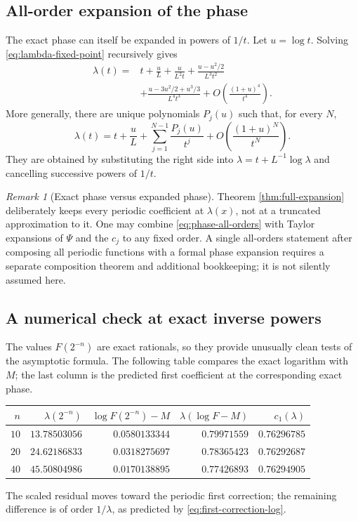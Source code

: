 \documentclass[11pt]{article}
\numberwithin{equation}{section}
\theoremstyle{definition}
\theoremstyle{remark}
\newtheorem{remark}[theorem]{Remark}
\begin{document}
\subsection{All-order expansion of the phase}

The exact phase can itself be expanded in powers of $1/t$.  Let $u=\log t$.
Solving \eqref{eq:lambda-fixed-point} recursively gives
\begin{equation}\label{eq:phase-first-terms}
 \begin{split}
 \lambda(t)={}&t+\frac{u}{L}
 +\frac{u}{L^2t}
 +\frac{u-u^2/2}{L^3t^2}\\
 &+\frac{u-3u^2/2+u^3/3}{L^4t^3}
 +O\left(\frac{(1+u)^4}{t^4}\right).
 \end{split}
\end{equation}
More generally, there are unique polynomials $P_j(u)$ such that, for every
$N$,
\begin{equation}\label{eq:phase-all-orders}
 \lambda(t)=t+\frac{u}{L}+
 \sum_{j=1}^{N-1}\frac{P_j(u)}{t^j}
 +O\left(\frac{(1+u)^N}{t^N}\right).
\end{equation}
They are obtained by substituting the right side into
$\lambda=t+L^{-1}\log\lambda$ and cancelling successive powers of $1/t$.

\begin{remark}[Exact phase versus expanded phase]
Theorem \ref{thm:full-expansion} deliberately keeps every periodic
coefficient at $\lambda(x)$, not at a truncated approximation to it.  One may
combine \eqref{eq:phase-all-orders} with Taylor expansions of $\Psi$ and the
$c_j$ to any fixed order.  A single all-orders statement after composing all
periodic functions with a formal phase expansion requires a separate
composition theorem and additional bookkeeping; it is not silently assumed
here.
\end{remark}

\subsection{A numerical check at exact inverse powers}

The values $F(2^{-n})$ are exact rationals, so they provide unusually clean
tests of the asymptotic formula.  The following table compares the exact
logarithm with $M$; the last column is the predicted first coefficient at the
corresponding exact phase.
\begin{center}
\begin{tabular}{@{}rrrrr@{}}
\toprule
$n$ & $\lambda(2^{-n})$ & $\log F(2^{-n})-M$ &
$\lambda(\log F-M)$ & $c_1(\lambda)$\\
\midrule
$10$ & $13.78503056$ & $0.0580133344$ & $0.79971559$ & $0.76296785$\\
$20$ & $24.62186833$ & $0.0318275697$ & $0.78365423$ & $0.76292687$\\
$40$ & $45.50804986$ & $0.0170138895$ & $0.77426893$ & $0.76294905$\\
\bottomrule
\end{tabular}
\end{center}
The scaled residual moves toward the periodic first correction; the remaining
difference is of order $1/\lambda$, as predicted by
\eqref{eq:first-correction-log}.
\end{document}
